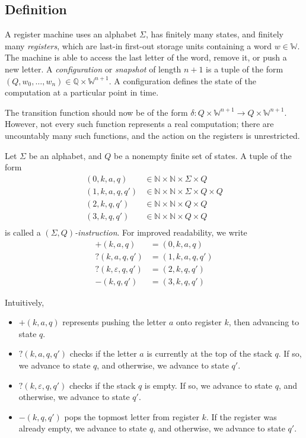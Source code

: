 \subsection{Definition}
A register machine uses an alphabet \( \Sigma \), has finitely many states, and finitely many \emph{registers}, which are last-in first-out storage units containing a word \( w \in \mathbb W \).
The machine is able to access the last letter of the word, remove it, or push a new letter.
A \emph{configuration} or \emph{snapshot} of length \( n+1 \) is a tuple of the form \( (Q, w_0, \dots, w_n) \in \mathbb Q \times \mathbb W^{n+1} \).
A configuration defines the state of the computation at a particular point in time.

The transition function should now be of the form \( \delta \colon Q \times \mathbb W^{n+1} \to Q \times \mathbb W^{n+1} \).
However, not every such function represents a real computation; there are uncountably many such functions, and the action on the registers is unrestricted.
\begin{definition}
	Let \( \Sigma \) be an alphabet, and \( Q \) be a nonempty finite set of states.
	A tuple of the form
	\begin{align*}
		(0,k,a,q) &\in \mathbb N \times \mathbb N \times \Sigma \times Q \\
		(1,k,a,q,q') &\in \mathbb N \times \mathbb N \times \Sigma \times Q \times Q \\
		(2,k,q,q') &\in \mathbb N \times \mathbb N \times Q \times Q \\
		(3,k,q,q') &\in \mathbb N \times \mathbb N \times Q \times Q \\
	\end{align*}
	is called a \emph{\( (\Sigma, Q) \)-instruction}.
	For improved readability, we write
	\begin{align*}
		+(k,a,q) &= (0,k,a,q) \\
		?(k,a,q,q') &= (1,k,a,q,q') \\
		?(k,\varepsilon,q,q') &= (2,k,q,q') \\
		-(k,q,q') &= (3,k,q,q')
	\end{align*}
\end{definition}
Intuitively,
\begin{itemize}
	\item \( +(k,a,q) \) represents pushing the letter \( a \) onto register \( k \), then advancing to state \( q \).
	\item \( ?(k,a,q,q') \) checks if the letter \( a \) is currently at the top of the stack \( q \).
		If so, we advance to state \( q \), and otherwise, we advance to state \( q' \).
	\item \( ?(k,\varepsilon,q,q') \) checks if the stack \( q \) is empty.
		If so, we advance to state \( q \), and otherwise, we advance to state \( q' \).
	\item \( -(k,q,q') \) pops the topmost letter from register \( k \).
		If the register was already empty, we advance to state \( q \), and otherwise, we advance to state \( q' \).
\end{itemize}
